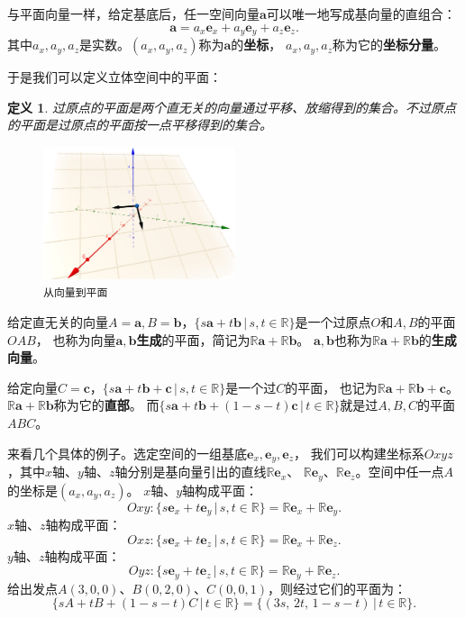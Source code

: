\documentclass[12pt,UTF8]{ctexbook}
\newtheorem{df}{定义}[section]
\begin{document}
与平面向量一样，给定基底后，任一空间向量$\mathbf{a}$可以唯一地写成基向量的直组合：
$$ \mathbf{a} = a_x\mathbf{e}_x + a_y\mathbf{e}_y + a_z\mathbf{e}_z.$$
其中$a_x, a_y, a_z$是实数。$(a_x, a_y, a_z)$称为$\mathbf{a}$的\textbf{坐标}，
$a_x, a_y, a_z$称为它的\textbf{坐标分量}。

于是我们可以定义立体空间中的平面：
\begin{df}
    过原点的平面是两个直无关的向量通过平移、放缩得到的集合。不过原点的平面是过原点的平面按一点平移得到的集合。
\end{df}

\begin{figure}[h] 
    \centering
    \includegraphics[width=0.5\textwidth]{空间基底1.png}
    \caption*{\texttt{从向量到平面}}
\end{figure}

给定直无关的向量$A = \mathbf{a}, B = \mathbf{b}$，$ \{s\mathbf{a} + t\mathbf{b} \, | \, s, t\in\mathbb{R}\}$是一个过原点$O$和$A, B$的平面$OAB$，
也称为向量$\mathbf{a},\mathbf{b}$\textbf{生成}的平面，简记为$\mathbb{R}\mathbf{a}+\mathbb{R}\mathbf{b}$。
$\mathbf{a},\mathbf{b}$也称为$\mathbb{R}\mathbf{a}+\mathbb{R}\mathbf{b}$的\textbf{生成向量}。

给定向量$C = \mathbf{c}$，$ \{s\mathbf{a}+t\mathbf{b}+\mathbf{c}\, | \, s,t\in\mathbb{R}\}$是一个过$C$的平面，
也记为$\mathbb{R}\mathbf{a}+\mathbb{R}\mathbf{b}+\mathbf{c}$。$\mathbb{R}\mathbf{a}+\mathbb{R}\mathbf{b}$称为它的\textbf{直部}。
而$ \{s\mathbf{a}+t\mathbf{b}+(1 - s - t)\mathbf{c} \, | \, t\in\mathbb{R}\}$就是过$A,B,C$的平面$ABC$。

来看几个具体的例子。选定空间的一组基底$\mathbf{e}_x,\mathbf{e}_y,\mathbf{e}_z$，
我们可以构建坐标系$Oxyz$，其中$x$轴、$y$轴、$z$轴分别是基向量引出的直线$\mathbb{R}\mathbf{e}_x$、
$\mathbb{R}\mathbf{e}_y$、$\mathbb{R}\mathbf{e}_z$。空间中任一点$A$的坐标是$(a_x,a_y,a_z)$。
$x$轴、$y$轴构成平面：
$$ Oxy : \{s\mathbf{e}_x+t\mathbf{e}_y\,|\,s,t\in\mathbb{R}\} = \mathbb{R}\mathbf{e}_x + \mathbb{R}\mathbf{e}_y. $$
$x$轴、$z$轴构成平面：
$$ Oxz : \{s\mathbf{e}_x+t\mathbf{e}_z\,|\,s,t\in\mathbb{R}\} = \mathbb{R}\mathbf{e}_x + \mathbb{R}\mathbf{e}_z. $$
$y$轴、$z$轴构成平面：
$$ Oyz : \{s\mathbf{e}_y+t\mathbf{e}_z\,|\,s,t\in\mathbb{R}\} = \mathbb{R}\mathbf{e}_y + \mathbb{R}\mathbf{e}_z. $$
给出发点$A(3,0,0)$、$B(0,2,0)$、$C(0,0,1)$，则经过它们的平面为：
$$ \{sA+tB+(1 - s - t)C \, | \, t\in\mathbb{R}\} = \{(3s,\,2t,\,1-s-t) \, | \, t\in\mathbb{R}\}. $$
\end{document}
